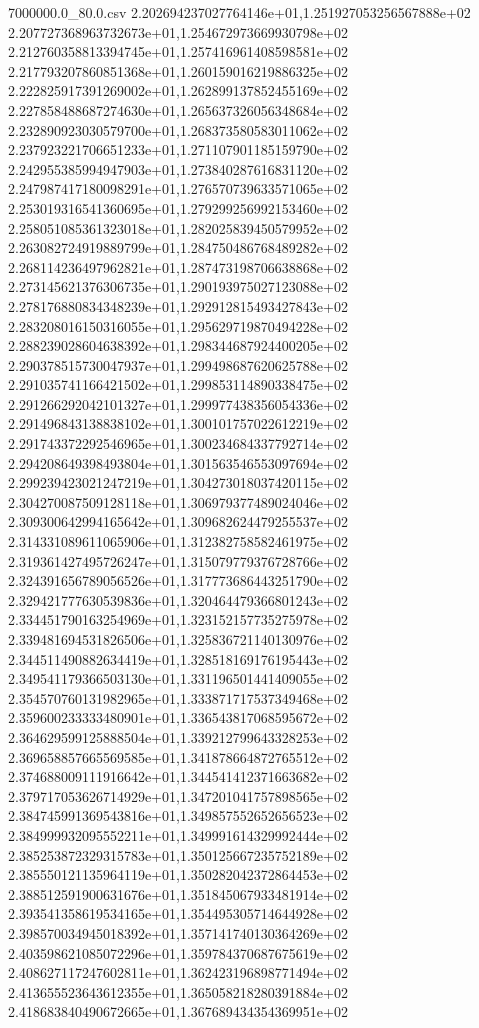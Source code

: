 \begin{filecontents*}{7000000.0_80.0.csv}
2.202694237027764146e+01,1.251927053256567888e+02
2.207727368963732673e+01,1.254672973669930798e+02
2.212760358813394745e+01,1.257416961408598581e+02
2.217793207860851368e+01,1.260159016219886325e+02
2.222825917391269002e+01,1.262899137852455169e+02
2.227858488687274630e+01,1.265637326056348684e+02
2.232890923030579700e+01,1.268373580583011062e+02
2.237923221706651233e+01,1.271107901185159790e+02
2.242955385994947903e+01,1.273840287616831120e+02
2.247987417180098291e+01,1.276570739633571065e+02
2.253019316541360695e+01,1.279299256992153460e+02
2.258051085361323018e+01,1.282025839450579952e+02
2.263082724919889799e+01,1.284750486768489282e+02
2.268114236497962821e+01,1.287473198706638868e+02
2.273145621376306735e+01,1.290193975027123088e+02
2.278176880834348239e+01,1.292912815493427843e+02
2.283208016150316055e+01,1.295629719870494228e+02
2.288239028604638392e+01,1.298344687924400205e+02
2.290378515730047937e+01,1.299498687620625788e+02
2.291035741166421502e+01,1.299853114890338475e+02
2.291266292042101327e+01,1.299977438356054336e+02
2.291496843138838102e+01,1.300101757022612219e+02
2.291743372292546965e+01,1.300234684337792714e+02
2.294208649398493804e+01,1.301563546553097694e+02
2.299239423021247219e+01,1.304273018037420115e+02
2.304270087509128118e+01,1.306979377489024046e+02
2.309300642994165642e+01,1.309682624479255537e+02
2.314331089611065906e+01,1.312382758582461975e+02
2.319361427495726247e+01,1.315079779376728766e+02
2.324391656789056526e+01,1.317773686443251790e+02
2.329421777630539836e+01,1.320464479366801243e+02
2.334451790163254969e+01,1.323152157735275978e+02
2.339481694531826506e+01,1.325836721140130976e+02
2.344511490882634419e+01,1.328518169176195443e+02
2.349541179366503130e+01,1.331196501441409055e+02
2.354570760131982965e+01,1.333871717537349468e+02
2.359600233333480901e+01,1.336543817068595672e+02
2.364629599125888504e+01,1.339212799643328253e+02
2.369658857665569585e+01,1.341878664872765512e+02
2.374688009111916642e+01,1.344541412371663682e+02
2.379717053626714929e+01,1.347201041757898565e+02
2.384745991369543816e+01,1.349857552652656523e+02
2.384999932095552211e+01,1.349991614329992444e+02
2.385253872329315783e+01,1.350125667235752189e+02
2.385550121135964119e+01,1.350282042372864453e+02
2.388512591900631676e+01,1.351845067933481914e+02
2.393541358619534165e+01,1.354495305714644928e+02
2.398570034945018392e+01,1.357141740130364269e+02
2.403598621085072296e+01,1.359784370687675619e+02
2.408627117247602811e+01,1.362423196898771494e+02
2.413655523643612355e+01,1.365058218280391884e+02
2.418683840490672665e+01,1.367689434354369951e+02

\end{filecontents*}
